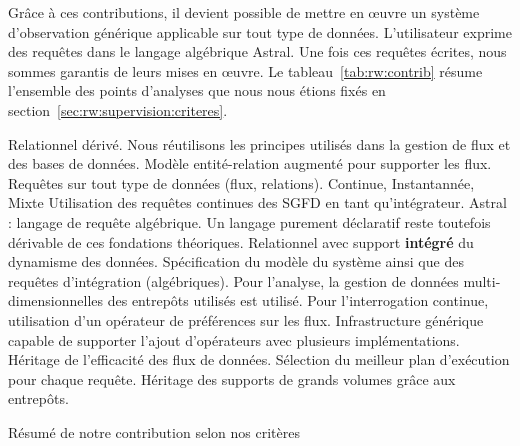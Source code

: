 Grâce à ces contributions, il devient possible de mettre en œuvre un système d'observation générique applicable sur tout type de données. L'utilisateur exprime des requêtes dans le langage algébrique Astral. Une fois ces requêtes écrites, nous sommes garantis de leurs mises en œuvre. Le tableau~\ref{tab:rw:contrib} résume l'ensemble des points d'analyses que nous nous étions fixés en section~\ref{sec:rw:supervision:criteres}.
\begin{table}[!ht]
\criteretabDonnee
    {Relationnel dérivé. Nous réutilisons les principes utilisés dans la gestion de flux et des bases de données.}
    {\good Modèle entité-relation augmenté pour supporter les flux.}
    {\good Requêtes sur tout type de données (flux, relations).}
\criteretabTraitement
    {\good Continue, Instantannée, Mixte}
    {\good Utilisation des requêtes continues des SGFD en tant qu'intégrateur.}
    {\meh Astral : langage de requête algébrique. Un langage purement déclaratif reste toutefois dérivable de ces fondations théoriques.}
    {\good Relationnel avec support \textbf{intégré} du dynamisme des données.}
\criteretabAdaptabilite
    {\good Spécification du modèle du système ainsi que des requêtes d'intégration (algébriques).}
    {\meh Pour l'analyse, la gestion de données multi-dimensionnelles des entrepôts utilisés est utilisé. Pour l'interrogation continue, utilisation d'un opérateur de préférences sur les flux.}
    {\good Infrastructure générique capable de supporter l'ajout d'opérateurs avec plusieurs implémentations.}
    {\good Héritage de l'efficacité des flux de données. Sélection du meilleur plan d'exécution pour chaque requête. Héritage des supports de grands volumes grâce aux entrepôts.}
\caption{Résumé de notre contribution selon nos critères}\label{tab:rw:contrib}
\end{table}